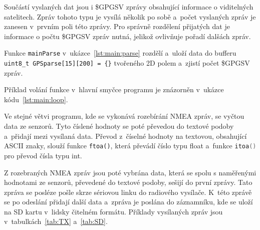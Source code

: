 \documentclass[twoside]{ctuthesis}
\theoremstyle{plain}
\theoremstyle{definition}
\theoremstyle{note}
\begin{document}
		Součástí vyslaných dat jsou i \$GPGSV zprávy obsahující informace o viditelných satelitech. Zpráv tohoto typu je vysílá několik po sobě a~počet vyslaných zpráv je zanesen v~prvním poli této zprávy. Pro správně rozdělení přijatých dat je informace o počtu \$GPGSV zpráv nutná, jelikož ovlivňuje pořadí dalšách zpráv.

		Funkce \lstinline[language=C] |mainParse| v~ukázce~\ref{lst:main:parse} rozdělí a~uloží data do bufferu \lstinline |uint8_t GPSparse[15][200] = {}|   tvořeného 2D polem a~zjistí počet \$GPGSV zpráv.

		



		Příklad volání funkce v~hlavní smyčce programu je znázorněn v~ukázce kódu~\ref{lst:main:loop}.
		

		Ve stejné větvi programu, kde se vykonává rozebírání NMEA zpráv, se vyčtou data ze senzorů. Tyto číslené hodnoty se poté převedou do textové podoby a~přidají mezi vysílaná data. Převod z~číselné hodnoty na textovou, obsahující ASCII znaky, slouží funkce \lstinline |ftoa()|, která převádí číslo typu float a~funkce \lstinline[language=C] |itoa()| pro převod čísla typu int. 

		Z rozebraných NMEA zpráv jsou poté vybrána data, která se spolu s naměřenými hodnotami ze senzorů, převedené do textové podoby, sešijí do první zprávy. Tato zpráva se posléze pošle skrze sériovou linku do radiového vysílače. K~této zprávě se po odeslání přidají další data a~zpráva je poslána do záznamníku, kde se uloží na SD kartu v~lidsky čitelném formátu. Příklady vysílaných zpráv jsou v~tabulkách~\ref{tab:TX} a~\ref{tab:SD}.
\end{document}
